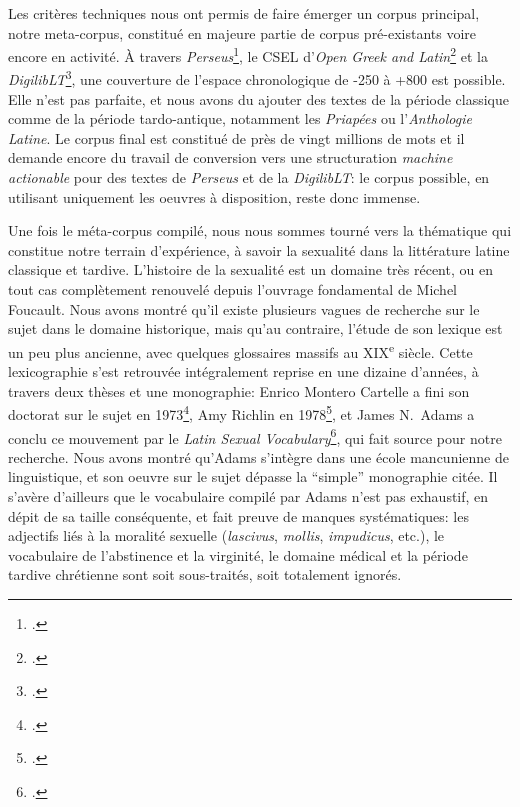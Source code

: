 Les critères techniques nous ont permis de faire émerger un corpus principal, notre meta-corpus, constitué en majeure partie de corpus pré-existants voire encore en activité. À travers \textit{Perseus}\footcite{perseus_latinLit}, le CSEL d'\textit{Open Greek and Latin}\footcite{csel_latinlit} et la \textit{DigilibLT}\footcite{digiliblt}, une couverture de l'espace chronologique de -250 à +800 est possible. Elle n'est pas parfaite, et nous avons du ajouter des textes de la période classique comme de la période tardo-antique, notamment les \textit{Priapées} ou l'\textit{Anthologie Latine}. Le corpus final est constitué de près de vingt millions de mots et il demande encore du travail de conversion vers une structuration \textit{machine actionable} pour des textes de \textit{Perseus} et de la \textit{DigilibLT}: le corpus possible,
en utilisant uniquement les oeuvres à disposition, reste donc immense.

Une fois le méta-corpus compilé, nous nous sommes tourné vers la thématique qui constitue notre terrain d'expérience, à savoir la sexualité dans la littérature latine classique et tardive. L'histoire de la sexualité est un domaine très récent, ou en tout cas complètement renouvelé depuis l'ouvrage fondamental de Michel Foucault. Nous avons montré qu'il existe plusieurs vagues de recherche sur le sujet dans le domaine historique, mais qu'au contraire, l'étude de son lexique est un peu plus ancienne, avec quelques glossaires massifs au XIX\textsuperscript{e} siècle. Cette lexicographie s'est retrouvée intégralement reprise en une dizaine d'années, à travers deux thèses et une monographie: Enrico Montero Cartelle a fini son doctorat sur le sujet en 1973\footcite{montero_cartelle_aspectos_1973}, Amy Richlin en 1978\footcite{richlin_sexual_1978}, et James N.~Adams a conclu ce mouvement par le \textit{Latin Sexual Vocabulary}\footcite{adams}, qui fait source pour notre recherche. Nous avons montré qu'Adams s'intègre dans une école mancunienne de linguistique, et son oeuvre sur le sujet dépasse la \enquote{simple} monographie citée. Il s'avère d'ailleurs que le vocabulaire compilé par Adams n'est pas exhaustif, en dépit de sa taille conséquente, et fait preuve de manques systématiques: les adjectifs liés à la moralité sexuelle (\textit{lascivus}, \textit{mollis}, \textit{impudicus}, etc.), le vocabulaire de l'abstinence et la virginité, le domaine médical et la période tardive chrétienne sont soit sous-traités, soit totalement ignorés.

